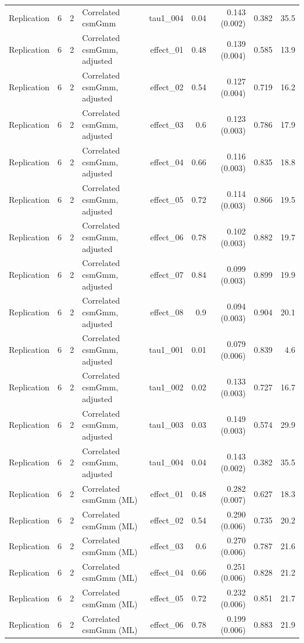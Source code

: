 \begin{longtable}{lcclrrrrr}
Replication & 6 & 2 & Correlated csmGmm & tau1\_004 & 0.04 & 0.143 (0.002) & 0.382 & 35.5\\
Replication & 6 & 2 & Correlated csmGmm, adjusted & effect\_01 & 0.48 & 0.139 (0.004) & 0.585 & 13.9\\
Replication & 6 & 2 & Correlated csmGmm, adjusted & effect\_02 & 0.54 & 0.127 (0.004) & 0.719 & 16.2\\
Replication & 6 & 2 & Correlated csmGmm, adjusted & effect\_03 & 0.6 & 0.123 (0.003) & 0.786 & 17.9\\
Replication & 6 & 2 & Correlated csmGmm, adjusted & effect\_04 & 0.66 & 0.116 (0.003) & 0.835 & 18.8\\
Replication & 6 & 2 & Correlated csmGmm, adjusted & effect\_05 & 0.72 & 0.114 (0.003) & 0.866 & 19.5\\
Replication & 6 & 2 & Correlated csmGmm, adjusted & effect\_06 & 0.78 & 0.102 (0.003) & 0.882 & 19.7\\
Replication & 6 & 2 & Correlated csmGmm, adjusted & effect\_07 & 0.84 & 0.099 (0.003) & 0.899 & 19.9\\
Replication & 6 & 2 & Correlated csmGmm, adjusted & effect\_08 & 0.9 & 0.094 (0.003) & 0.904 & 20.1\\
Replication & 6 & 2 & Correlated csmGmm, adjusted & tau1\_001 & 0.01 & 0.079 (0.006) & 0.839 & 4.6\\
Replication & 6 & 2 & Correlated csmGmm, adjusted & tau1\_002 & 0.02 & 0.133 (0.003) & 0.727 & 16.7\\
Replication & 6 & 2 & Correlated csmGmm, adjusted & tau1\_003 & 0.03 & 0.149 (0.003) & 0.574 & 29.9\\
Replication & 6 & 2 & Correlated csmGmm, adjusted & tau1\_004 & 0.04 & 0.143 (0.002) & 0.382 & 35.5\\
Replication & 6 & 2 & Correlated csmGmm (ML) & effect\_01 & 0.48 & 0.282 (0.007) & 0.627 & 18.3\\
Replication & 6 & 2 & Correlated csmGmm (ML) & effect\_02 & 0.54 & 0.290 (0.006) & 0.735 & 20.2\\
Replication & 6 & 2 & Correlated csmGmm (ML) & effect\_03 & 0.6 & 0.270 (0.006) & 0.787 & 21.6\\
Replication & 6 & 2 & Correlated csmGmm (ML) & effect\_04 & 0.66 & 0.251 (0.006) & 0.828 & 21.2\\
Replication & 6 & 2 & Correlated csmGmm (ML) & effect\_05 & 0.72 & 0.232 (0.006) & 0.851 & 21.7\\
Replication & 6 & 2 & Correlated csmGmm (ML) & effect\_06 & 0.78 & 0.199 (0.006) & 0.883 & 21.9\\

\end{longtable}
